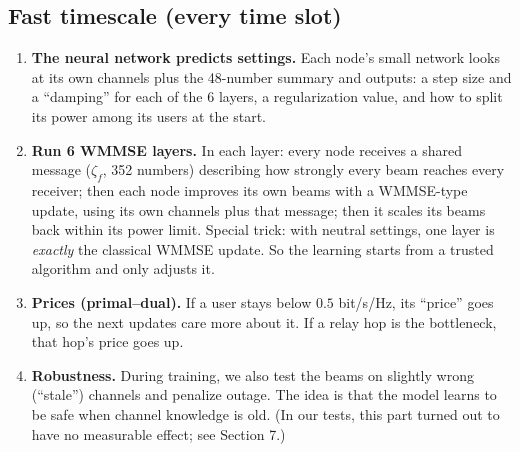 \documentclass[11pt,a4paper]{article}
\begin{document}
\subsection*{Fast timescale (every time slot)}
\begin{enumerate}[label=\textbf{Step \arabic*.},leftmargin=4em,start=4]
\item \textbf{The neural network predicts settings.} Each node's small network looks at its own channels plus
  the 48-number summary and outputs: a step size and a ``damping'' for each of the 6 layers, a regularization
  value, and how to split its power among its users at the start.
\item[\textbf{Steps 5--8}] \textbf{Run 6 WMMSE layers.} In each layer: every node receives a shared message
  ($\zeta_f$, 352 numbers) describing how strongly every beam reaches every receiver; then each node improves its
  own beams with a WMMSE-type update, using its own channels plus that message; then it scales its beams back
  within its power limit. Special trick: with neutral settings, one layer is \emph{exactly} the classical WMMSE
  update. So the learning starts from a trusted algorithm and only adjusts it.
\item[\textbf{Step 9}] \textbf{Prices (primal--dual).} If a user stays below $0.5$ bit/s/Hz, its ``price'' goes up,
  so the next updates care more about it. If a relay hop is the bottleneck, that hop's price goes up.
\item[\textbf{Step 10}] \textbf{Robustness.} During training, we also test the beams on slightly wrong
  (``stale'') channels and penalize outage. The idea is that the model learns to be safe when channel knowledge
  is old. (In our tests, this part turned out to have no measurable effect; see Section 7.)
\end{enumerate}
\end{document}

